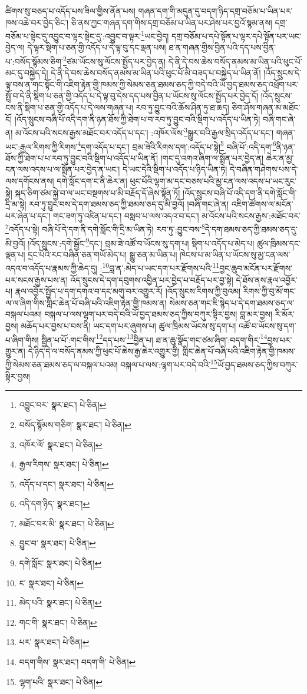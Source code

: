 ཚིགས་སུ་བཅད་པ་འདོད་པས་ཟིལ་གྱིས་ནོན་པས། གཞན་དག་གི་མདུན་དུ་བདག་ཉིད་དགྲ་བཅོམ་པ་ཡིན་པར་ཁས་འཆེ་བར་བྱེད་ཅིང་། ཅི་ནས་ཀྱང་གཞན་དག་གིས་དགྲ་བཅོམ་པ་ཡིན་པར་ཤེས་པར་བྱའོ་སྙམ་ནས། དགྲ་བཅོམ་པ་སྟེང་དུ་འབྱུང་བ་ལྟར་སྟེང་དུ་:འབྱུང་བ་ལྟར་\footnote{འབྱུང་བར་  སྣར་ཐང་།  པེ་ཅིན། }ཡང་བྱེད། དགྲ་བཅོམ་པ་དཔེ་སྟོན་པ་ལྟར་དཔེ་སྟོན་པར་ཡང་བྱེད་ལ། དེ་ལྟར་སྡིག་པ་ཅན་གྱི་འདོད་པ་དེ་ལྟ་བུ་དང་ལྡན་པས། ཐ་ན་གཞན་གྱིས་བྱིན་པའི་དད་པས་བྱིན་པ་:བསོད་སྙོམས་ཅིག་\footnote{བསོད་སྙོམས་གཅིག་  སྣར་ཐང་།  པེ་ཅིན། }ཙམ་ཡོངས་སུ་ལོངས་སྤྱོད་པར་བྱེད་ན། དེ་ནི་དེ་བས་ཆེས་བསོད་ནམས་མ་ཡིན་པའི་ཕུང་པོ་མང་དུ་བསྐྱེད་དེ། དེ་ནི་དེ་བས་ཆེས་བསོད་ནམས་མ་ཡིན་པའི་ཕུང་པོ་མི་བཟད་པ་བསྐྱེད་པ་ཡིན་ནོ། །འོད་སྲུངས་དེ་ལྟ་བས་ན་གང་སྟོང་གི་འཇིག་རྟེན་གྱི་ཁམས་ཀྱི་སེམས་ཅན་ཐམས་ཅད་ཀྱི་བདེ་བའི་ཡོ་བྱད་ཐམས་ཅད་འཕྲོག་པར་སྤྲོ་བ་དེ་ནི་སྡིག་པ་ཅན་གྱི་འདོད་པ་དེ་ལྟ་བུ་དེས་དད་པས་བྱིན་པ་ཡོངས་སུ་ལོངས་སྤྱོད་པར་བྱེད་དོ། །འོད་སྲུངས་ངས་ནི་སྡིག་པ་ཅན་གྱི་འདོད་པ་དེ་ལས་གཞན་པ། རབ་ཏུ་བྱུང་བའི་ཆོས་ཤིན་ཏུ་ཐ་ཆད། ཅིག་ཤོས་གཞན་མ་མཐོང་ངོ། །འོད་སྲུངས་བཞི་པོ་འདི་དག་ནི་ཉན་ཐོས་ཀྱི་ཐེག་པ་བ་རབ་ཏུ་བྱུང་བའི་སྡིག་པ་འདོད་པ་ཡིན་ཏེ། བཞི་གང་ཞེ་ན། མ་འོངས་པའི་སངས་རྒྱས་མཐོང་བར་འདོད་པ་དང་། :འཁོར་ལོས་\footnote{འཁོར་ལོ་  སྣར་ཐང་།  པེ་ཅིན། }སྒྱུར་བའི་རྒྱལ་སྲིད་འདོད་པ་དང་། གཞན་ཡང་:རྒྱལ་རིགས་ཀྱི་རིགས་\footnote{རྒྱལ་རིགས་  སྣར་ཐང་།  པེ་ཅིན། }དག་འདོད་པ་དང་། བྲམ་ཟེའི་རིགས་དག་:འདོད་པ་སྟེ།\footnote{འདོད་པ་དང་།  སྣར་ཐང་།  པེ་ཅིན། } བཞི་པོ་:འདི་དག་\footnote{འདི་དག་ཉིད་  སྣར་ཐང་། }ནི་ཉན་ཐོས་ཀྱི་ཐེག་པ་པ་རབ་ཏུ་བྱུང་བའི་སྡིག་པ་འདོད་པ་ཡིན་ནོ། །གང་དུ་འགའ་ཞིག་ལ་སྨོན་པར་བྱེད་ན། ཆེར་ན་མྱ་ངན་ལས་འདས་པ་ལ་སྨོན་པར་བྱེད་ན་ཡང་། དེ་ཡང་དེའི་སྡིག་པ་འདོད་པ་ཉིད་ཡིན་ཏེ། དེ་བཞིན་གཤེགས་པས་དེ་ལས་དགོངས་ནས། དགེ་སློང་དག་ང་ནི་ཆེར་ན། ཕུང་པོའི་ལྷག་མ་དང་བཅས་པའི་མྱ་ངན་ལས་འདས་པ་ཡང་རུང་སྟེ། སྐད་ཅིག་ཙམ་སྐྱེ་བ་ལ་ཡང་བསྔགས་པ་མི་བརྗོད་དོ་ཞེས་སྟོན་ཏོ། །འོད་སྲུངས་བཞི་པོ་འདི་དག་ནི་དགེ་སློང་གི་དྲི་མ་སྟེ། རབ་ཏུ་བྱུང་བས་དེ་དག་ཐམས་ཅད་ཀྱི་ཐམས་ཅད་དུ་མི་བྱའོ། །བཞི་གང་ཞེ་ན། འཇིག་ཚོགས་ལ་མངོན་པར་ཞེན་པ་དང་། གང་ཟག་ཏུ་འཛིན་པ་དང་། བསླབ་པ་ལས་འདའ་བ་དང་། མ་འོངས་པའི་སངས་རྒྱས་:མཐོང་བར་\footnote{མཐོང་བར་མི་  སྣར་ཐང་།  པེ་ཅིན། }འདོད་པ་སྟེ། བཞི་པོ་དེ་དག་ནི་དགེ་སློང་གི་དྲི་མ་ཡིན་ཏེ། རབ་ཏུ་:བྱུང་བས་\footnote{བྱུང་བ་  སྣར་ཐང་།  པེ་ཅིན། }དེ་དག་ཐམས་ཅད་ཀྱི་ཐམས་ཅད་དུ་མི་བྱའོ། །འོད་སྲུངས་:དགེ་སྦྱོང་\footnote{དགེ་སློང་  སྣར་ཐང་།  པེ་ཅིན། }དང་། བྲམ་ཟེ་འཚོ་བ་ཡོངས་སུ་དག་པ། སྡིག་པ་འདོད་པ་མེད་པ། ཚུལ་ཁྲིམས་དང་ལྡན་པ། དྲང་པོའི་རང་བཞིན་ཅན་གཡོ་མེད་པ། སྒྱུ་ཅན་མ་ཡིན་པ། ཁེངས་པ་མ་ཡིན་པ་ཡོངས་སུ་མྱ་ངན་ལས་འདའ་བ་འདོད་པ་རྣམས་ཀྱི་ཆེད་དུ། :\footnote{ང་  སྣར་ཐང་།  པེ་ཅིན། }བླ་ན་:མེད་པ་ཡང་དག་པར་རྫོགས་པའི་\footnote{མེད་པའི་  སྣར་ཐང་།  པེ་ཅིན། }བྱང་ཆུབ་མངོན་པར་རྫོགས་པར་སངས་རྒྱས་པས་ན། འོད་སྲུངས་དེ་དག་དབུགས་འབྱིན་པར་བྱེད་པ་བརྗོད་པར་བྱ་སྟེ། དེ་ཐོས་ནས་རྣལ་འབྱོར་པ། རྣལ་འབྱོར་སྤྱོད་པ་དག་དགའ་བ་དང་མགུ་བར་འགྱུར་རོ། །འོད་སྲུངས་རིགས་ཀྱི་བུའམ། རིགས་ཀྱི་བུ་མོ་གང་ལ་ལ་ཞིག་གིས་གླིང་ཆེན་པོ་བཞི་པའི་འཇིག་རྟེན་གྱི་ཁམས་ན། སེམས་ཅན་གང་ཇི་སྙེད་པ་དེ་དག་ཐམས་ཅད་ལ་བསྐལ་པའམ། བསྐལ་པ་ལས་ལྷག་པར་བདེ་བའི་ཡོ་བྱད་ཐམས་ཅད་ཀྱིས་བཀུར་སྟིར་བྱས། བླ་མར་བྱས། རི་མོར་བྱས། མཆོད་པར་བྱས་པ་བས་ནི། ཡང་དག་པར་ཞུགས་པ། ཚུལ་ཁྲིམས་ཡོངས་སུ་དག་པ། འཚོ་བ་ཡོངས་སུ་དག་པ་ཞིག་གིས། སྦྱིན་པ་པོ་:གང་གིས་\footnote{གང་གི་  སྣར་ཐང་།  པེ་ཅིན། }དད་པས་\footnote{པར་  སྣར་ཐང་།  པེ་ཅིན། }བྱིན་པ། ཐ་ན་ཆུ་སྣོད་གང་ཙམ་ཞིག་:བདག་གིར་\footnote{བདག་གིས་  སྣར་ཐང་། བདག་གི་  པེ་ཅིན། }བྱས་པར་གྱུར་ན། དེ་ཉིད་དེ་ལ་བསོད་ནམས་ཀྱི་ཕུང་པོ་ཆེས་རྒྱ་ཆེར་འགྱུར་གྱི། གླིང་ཆེན་པོ་བཞི་པའི་འཇིག་རྟེན་གྱི་ཁམས་ཀྱི་སེམས་ཅན་ཐམས་ཅད་ལ་བསྐལ་པའམ། བསྐལ་པ་ལས་:ལྷག་པར་བདེ་བའི་\footnote{ལྷག་པའི་  སྣར་ཐང་།  པེ་ཅིན། }ཡོ་བྱད་ཐམས་ཅད་ཀྱིས་བཀུར་སྟིར་བྱས། 